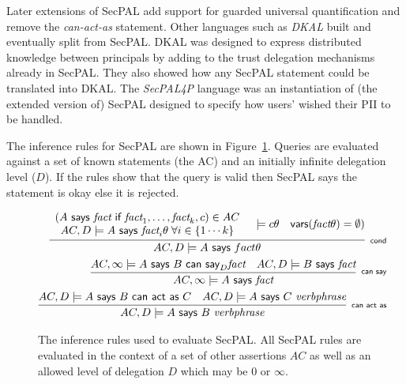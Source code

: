 \documentclass[a4paper]{article}
\begin{document}
Later extensions of {SecPAL}\cite{Becker:2009vt} add support for guarded
universal quantification and remove the \emph{can-act-as} statement. Other
languages such as \emph{DKAL}\cite{Gurevich:2008fz} built and eventually split
from {SecPAL}. DKAL was designed to express distributed knowledge between
principals by adding to the trust delegation mechanisms already in {SecPAL}.
They also showed how any {SecPAL} statement could be translated into {DKAL}.
The \emph{{SecPAL}4P} language\cite{Becker:2009ula} was an instantiation of (the
extended version of) {SecPAL} designed to specify how users' wished their
\ac{PII} to be handled.

The inference rules for SecPAL are shown in Figure~\ref{secpal:rules}. Queries
are evaluated against a set of known statements (the \ac{AC}) and an initially
infinite delegation level ($D$). If the rules show that the query is valid then
SecPAL says the statement is okay else it is rejected.

\begin{figure}\label{secpal:rules}
  \centering
  \begin{eqnarray*}
    \infer[\textsf{\scriptsize cond}]{%
      AC, D \models A\textsf{~says~}fact\theta
    }{%
      \begin{array}[c]{c}
        \left(A\textsf{~says~}\textit{fact}\textsf{~if~}\textit{fact}_1, \ldots, \textit{fact}_k, c\right) \in AC \\
        AC,D\models A\textsf{~says~}\textit{fact}_i\theta \; \forall i \in \{1\cdots k\}
      \end{array}
      & \models{c\theta}
      & \textsf{vars}(\textit{fact}\theta) = \emptyset)
    }\\
    \infer[\textsf{\scriptsize can say}]{%
      AC, \infty \models A\textsf{~says~}\textit{fact}
    }{%
      AC, \infty \models A\textsf{~says~}B\textsf{~can~say}_D \textit{fact}
      & AC, D \models B\textsf{~says~}\textit{fact}
    } \\
    \infer[\textsf{\scriptsize can act as}]{%
      AC, D \models A\textsf{~says~}B~\textit{verbphrase}
    }{%
      AC, D \models A\textsf{~says~}B\textsf{~can~act~as~}C
      & AC, D \models A\textsf{~says~}C~\textit{verbphrase}
    }
  \end{eqnarray*}
  \caption{The inference rules used to evaluate {SecPAL}. All {SecPAL} rules are
  evaluated in the context of a set of other assertions $AC$ as well as an
  allowed level of delegation $D$ which may be $0$ or $\infty$.}
\end{figure}
\end{document}

